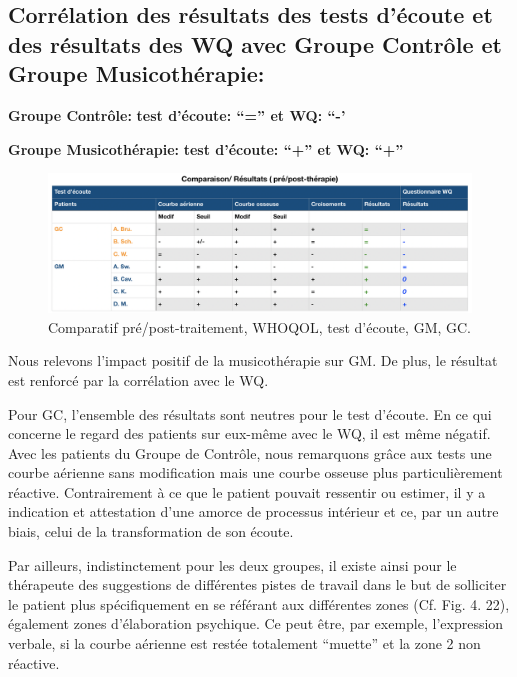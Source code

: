   \subsection{Corrélation des résultats des tests d'écoute et des
    résultats des WQ avec Groupe Contrôle et
    Groupe Musicothérapie:}
\textbf{Groupe Contrôle:} 	          \textbf{ test d'écoute: ``=''   et    WQ: ``-'}


\textbf{Groupe Musicothérapie:}     \textbf{test d'écoute: ``+''      et    WQ: ``+''}


 \begin{figure}[th]
\centering
\includegraphics[width=1\linewidth]{images/graphiques/comparaison_pre_post.png}
\caption[Corrélation résultats pré/post]{Comparatif
  pré/post-traitement, WHOQOL, test d'écoute, GM, GC.}

\label{comparaison_pre_post}
\end{figure}



                Nous relevons l'impact positif de la
                musicothérapie sur GM.
                De plus, le résultat est renforcé par la corrélation
                avec le WQ.


                Pour GC, l'ensemble des résultats sont neutres pour le
                test d'écoute. En ce qui concerne le
                regard des patients sur eux-même avec le WQ, il est
                même négatif. Avec les patients du Groupe de
              Contrôle, nous remarquons grâce aux tests une courbe aérienne
              sans modification mais une courbe osseuse plus
              particulièrement réactive. Contrairement à
              ce que le patient pouvait ressentir ou estimer, il y a indication  et attestation d'une amorce de
              processus intérieur et ce, par un autre biais, celui de
              la transformation de son
              écoute.

 Par ailleurs, indistinctement pour les deux
 groupes, il existe ainsi pour le thérapeute des
 suggestions de différentes pistes de travail dans le but de
 solliciter le patient plus spécifiquement en se référant aux
              différentes zones (Cf. Fig. 4. 22), également zones
 d'élaboration psychique. Ce peut être, par exemple,
              l'expression verbale, si la courbe aérienne est restée
              totalement ``muette'' et la zone 2 non
              réactive.

